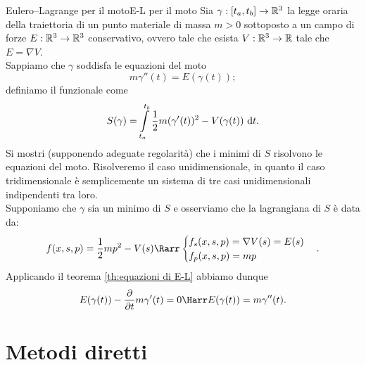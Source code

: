 \documentclass[openany]{book}
\begin{document}
\begin{exercise}{Eulero--Lagrange per il moto}{E-L per il moto}
    Sia $\gamma : [t_a,t_b]\to \mathbb{R}^3$ la legge oraria della traiettoria di un punto materiale di massa $m>0$ sottoposto a un campo di forze $E : \mathbb{R}^3 \to \mathbb{R}^3$ conservativo, ovvero tale che esista $V : \mathbb{R}^3\to \mathbb{R}$ tale che $E = \nabla V$.\\ Sappiamo che $\gamma$ soddisfa le equazioni del moto
    \[ m \gamma''(t) = E(\gamma(t)); \]
    definiamo il funzionale  come
    \[S(\gamma) = \intop_{t_a}^{t_b} \frac{1}{2} m (\gamma'(t))^2 - V(\gamma(t)) \de t .\]
    Si mostri (supponendo adeguate regolarità) che i minimi di $S$ risolvono le equazioni del moto.
    \solution 
    Risolveremo il caso unidimensionale, in quanto il caso tridimensionale è semplicemente un sistema di tre casi unidimensionali indipendenti tra loro.\\
    Supponiamo che $\gamma$ sia un minimo di $S$ e osserviamo che la lagrangiana di $S$ è data da:
    \[ f(x,s,p) = \frac{1}{2}m p^2 - V(s) \Rarr\begin{cases} f_s(x,s,p) = \nabla V(s) = E(s) \\ f_p(x,s,p)= m p\end{cases}. \]
    Applicando il teorema \ref{th:equazioni di E-L} abbiamo dunque 
    \[ E(\gamma(t)) - \frac{\partial}{\partial t} m \gamma'(t) = 0 \Harr E(\gamma(t)) = m \gamma''(t). \]
    \solved
\end{exercise}

\chapter{Metodi diretti}

\printbibliography[heading=bibintoc]
\end{document}
